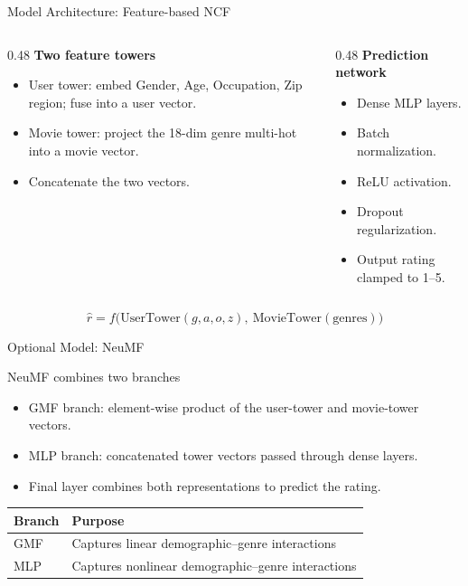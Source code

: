\documentclass[aspectratio=169]{beamer}
\begin{document}
\begin{frame}{Model Architecture: Feature-based NCF}
\begin{columns}
  \begin{column}{0.48\textwidth}
    \textbf{Two feature towers}
    \begin{itemize}
      \item User tower: embed Gender, Age, Occupation, Zip region; fuse into a user vector.
      \item Movie tower: project the 18-dim genre multi-hot into a movie vector.
      \item Concatenate the two vectors.
    \end{itemize}
  \end{column}
  \begin{column}{0.48\textwidth}
    \textbf{Prediction network}
    \begin{itemize}
      \item Dense MLP layers.
      \item Batch normalization.
      \item ReLU activation.
      \item Dropout regularization.
      \item Output rating clamped to 1--5.
    \end{itemize}
  \end{column}
\end{columns}

\vspace{0.25cm}

\[
\hat{r} = f\big(\text{UserTower}(g, a, o, z),\ \text{MovieTower}(\text{genres})\big)
\]
\end{frame}

\begin{frame}{Optional Model: NeuMF}
\begin{block}{NeuMF combines two branches}
\begin{itemize}
  \item GMF branch: element-wise product of the user-tower and movie-tower vectors.
  \item MLP branch: concatenated tower vectors passed through dense layers.
  \item Final layer combines both representations to predict the rating.
\end{itemize}
\end{block}

\vspace{0.25cm}

\begin{table}
\centering
\begin{tabular}{ll}
\toprule
\textbf{Branch} & \textbf{Purpose} \\
\midrule
GMF & Captures linear demographic--genre interactions \\
MLP & Captures nonlinear demographic--genre interactions \\
\bottomrule
\end{tabular}
\end{table}
\end{frame}
\end{document}
